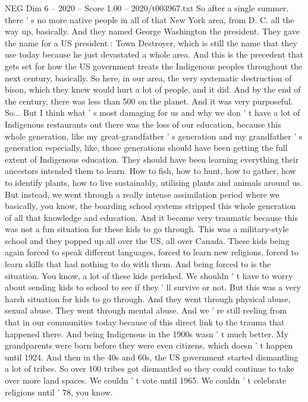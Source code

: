 \begin{textsample}{NEG Dim 6 – 2020 – Score 1.00 – 2020/t003967.txt}
So after a single summer, there ' s no more native people in all of that New York area, from D.
C. all the way up, basically.
And they named George Washington the president.
They gave the name for a US president : Town Destroyer, which is still the name that they use today because he just devastated a whole area.
And this is the precedent that gets set for how the US government treats the Indigenous peoples throughout the next century, basically.
So here, in our area, the very systematic destruction of bison, which they knew would hurt a lot of people, and it did.
And by the end of the century, there was less than 500 on the planet.
And it was very purposeful.
So...
But I think what ' s most damaging for us and why we don ' t have a lot of Indigenous restaurants out there was the loss of our education, because this whole generation, like my great-grandfather ' s generation and my grandfather ' s generation especially, like, those generations should have been getting the full extent of Indigenous education.
They should have been learning everything their ancestors intended them to learn.
How to fish, how to hunt, how to gather, how to identify plants, how to live sustainably, utilising plants and animals around us.
But instead, we went through a really intense assimilation period where we basically, you know, the boarding school systems stripped this whole generation of all that knowledge and education.
And it became very traumatic because this was not a fun situation for these kids to go through.
This was a military-style school and they popped up all over the US, all over Canada.
These kids being again forced to speak different languages, forced to learn new religions, forced to learn skills that had nothing to do with them.
And being forced to is the situation.
You know, a lot of these kids perished.
We shouldn ' t have to worry about sending kids to school to see if they ' ll survive or not.
But this was a very harsh situation for kids to go through.
And they went through physical abuse, sexual abuse.
They went through mental abuse.
And we ' re still reeling from that in our communities today because of this direct link to the trauma that happened there.
And being Indigenous in the 1900s wasn ' t much better.
My grandparents were born before they were even citizens, which doesn ' t happen until 1924.
And then in the 40s and 60s, the US government started dismantling a lot of tribes.
So over 100 tribes got dismantled so they could continue to take over more land spaces.
We couldn ' t vote until 1965.
We couldn ' t celebrate religions until ' 78, you know.

\end{textsample}
